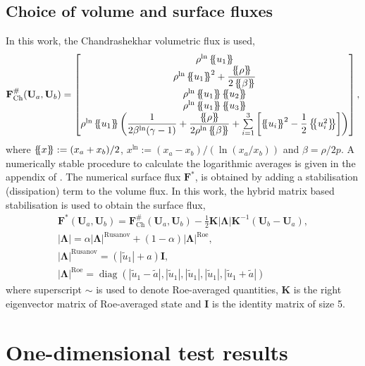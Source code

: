 \documentclass[a4paper,11pt,oneside]{article}
\newcommand{\vect}[1]{\ensuremath{\boldsymbol{\mathbf{#1}}}} %
\newcommand{\abs}[1]{\ensuremath{\left\lvert#1\right\rvert}} %
\DeclareMathOperator{\diag}{diag} %
\newcommand{\defeq}{\ensuremath{:=}} %
\newcommand{\avg}[1]{\ensuremath{\left\{ \mskip-5mu \left\{ #1 \right\} \mskip-5mu \right\}}} %
\newcommand{\textch}{\text{Ch}} %
\newcommand{\textln}{\text{ln}} %
\newcommand{\eulerref}[1]{\ensuremath{#1}} %
\begin{document}
\subsection{Choice of volume and surface fluxes}
\label{subsec:vol_surf_flux}
In this work, the Chandrashekhar volumetric flux \cite{gassnerWintersKopriva2016,chandrashekar2013} is used,
\begin{equation*}
	\vect{\eulerref{F}}^\#_\textch(\vect{\eulerref{U}}_a, \vect{\eulerref{U}}_b) =
	\begin{bmatrix}
		\rho^\textln \avg{u_1} \\
		\rho^\textln \avg{u_1}^2 + \dfrac{\avg{\rho}}{2\avg{\beta}} \\
		\rho^\textln \avg{u_1} \avg{u_2} \\
		\rho^\textln \avg{u_1} \avg{u_3} \\
		\rho^\textln \avg{u_1} \left( \dfrac{1}{2\beta^\textln (\gamma-1)} + \dfrac{\avg{\rho}}{2\rho^\textln \avg{\beta}} + \sum\limits_{i=1}^{3} \left[ \avg{u_i}^2 - \dfrac{1}{2} \avg{u_i^2} \right] \right)
	\end{bmatrix},
	\label{eq:1d_chandrashekhar_volume_flux}
\end{equation*}
where $\avg{x} \defeq (x_a + x_b)/2$, $x^\textln \defeq (x_a - x_b)/(\ln (x_a/x_b))$ and $\beta = \rho/2p$. A numerically stable procedure to calculate the logarithmic averages is given in the appendix of \cite{ismailRoe2009}. The numerical surface flux $\vect{\eulerref{F}}^*$, is obtained by adding a stabilisation (dissipation) term to the volume flux. In this work, the hybrid matrix based stabilisation \cite{chandrashekar2013} is used to obtain the surface flux,
\begin{gather}
	\vect{\eulerref{F}}^*(\vect{\eulerref{U}}_a, \vect{\eulerref{U}}_b) = \vect{\eulerref{F}}^\#_\textch(\vect{\eulerref{U}}_a, \vect{\eulerref{U}}_b) - \frac{1}{2} \vect{K} \abs{\vect{\Lambda}} \vect{K}^{-1} \left( \vect{\eulerref{U}}_b - \vect{\eulerref{U}}_a \right),\\
	\abs{\vect{\Lambda}} = \alpha \abs{\vect{\Lambda}}^\text{Rusanov} + (1-\alpha) \abs{\vect{\Lambda}}^\text{Roe},\\
	\abs{\vect{\Lambda}}^\text{Rusanov} = (\abs{\tilde{u}_1} + a) \vect{I},\\
	\abs{\vect{\Lambda}}^\text{Roe} = \diag \left( \abs{\tilde{u}_1 - \tilde{a}}, \abs{\tilde{u}_1}, \abs{\tilde{u}_1}, \abs{\tilde{u}_1}, \abs{\tilde{u}_1 + \tilde{a}} \right)
	\label{eq:1d_chandrashekhar_surface_flux}
\end{gather}
where superscript $\sim$ is used to denote Roe-averaged quantities, $\vect{K}$ is the right eigenvector matrix of Roe-averaged state and $\vect{I}$ is the identity matrix of size 5.



\section{One-dimensional test results}
\label{sec:1d_tests}

\printbibliography
\end{document}
